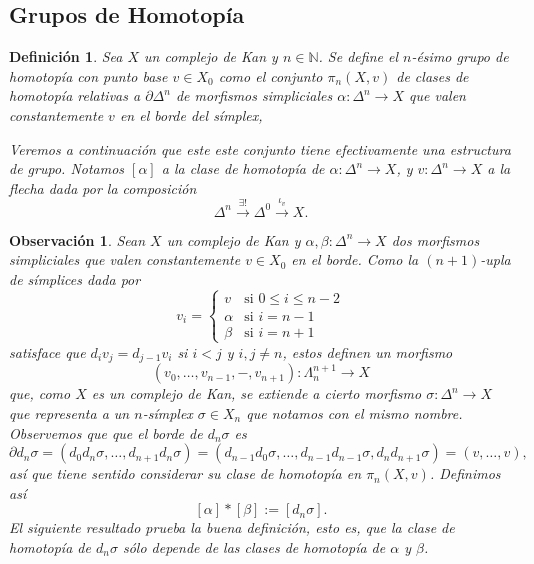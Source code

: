 \documentclass[11pt]{report}
\theoremstyle{colored}
\newtheorem{definition}{Definición}[section]
\newtheorem{remark}{Observación}[section]
\newcommand{\N}{\mathbb{N}}
\renewcommand{\ss}[1]{\Delta^{#1}}
\newcommand{\horn}[2]{\Lambda^{#1}_{#2}}
\begin{document}
\subsection{Grupos de Homotopía}

\begin{definition} Sea $X$ un complejo de Kan y $n \in \N$. Se define el $n$-ésimo grupo de homotopía con punto base $v \in X_0$ como el conjunto $\pi_n(X,v)$ de clases de homotopía relativas a $\partial \ss{n}$ de morfismos simpliciales $\alpha : \ss{n} \to X$ que valen constantemente $v$ en el borde del símplex,
\begin{center}
\end{center}
Veremos a continuación que este este conjunto tiene efectivamente una estructura de grupo. Notamos $[\alpha]$ a la clase de homotopía de $\alpha : \ss{n} \to X$, y $v : \ss{n} \to X$ a la flecha dada por la composición \[\ss{n} \xrightarrow{\exists!} \ss{0} \xrightarrow{\iota_v} X.\]
\end{definition}

\begin{remark} Sean $X$ un complejo de Kan y $\alpha,\beta : \ss{n} \to X$ dos morfismos simpliciales que valen constantemente $v \in X_0$ en el borde. Como la $(n+1)$-upla de símplices dada por
\[
v_i = \begin{cases}
v & \text{si $0 \leq i \leq n-2$}\\
\alpha & \text{si $i = n-1$}\\
\beta & \text{si $i = n+1$}
\end{cases}
\]
satisface que $d_iv_j = d_{j-1}v_i$ si $i<j$ y $i,j \neq n$, estos definen un morfismo
\[
(v_0,\dots,v_{n-1},-,v_{n+1}) : \horn{n+1}{n} \to X
\]
que, como $X$ es un complejo de Kan, se extiende a cierto morfismo $\sigma : \ss{n} \to X$ que representa a un $n$-símplex $\sigma \in X_n$ que notamos con el mismo nombre. Observemos que que el borde de $d_n\sigma$ es
\[
\partial d_n\sigma = (d_0d_n\sigma,\dots,d_{n+1}d_n\sigma) = (d_{n-1}d_0\sigma,\dots,d_{n-1}d_{n-1}\sigma,d_nd_{n+1}\sigma) = (v,\dots,v),
\]
así que tiene sentido considerar su clase de homotopía en $\pi_n(X,v)$. Definimos así
\[
[\alpha] \ast [\beta] := [d_n\sigma].
\]
El siguiente resultado prueba la buena definición, esto es, que la clase de homotopía de $d_n\sigma$ sólo depende de las clases de homotopía de $\alpha$ y $\beta$.
\end{remark}
\end{document}
